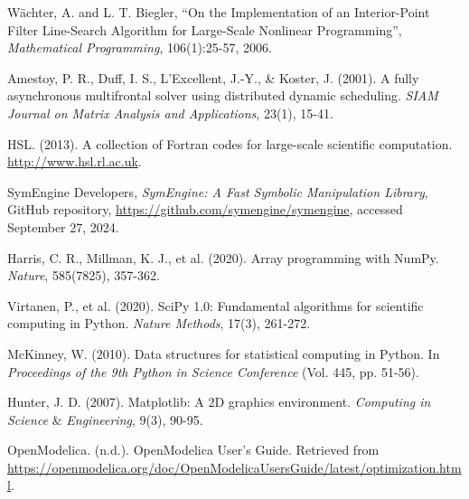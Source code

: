 \documentclass[12pt]{article}
\begin{document}
\newpage
\fancyhead[R]{}
\thispagestyle{fancy}

\begin{thebibliography}{9}
	
	
	
	Wächter, A. and L. T. Biegler, “On the Implementation of an Interior-Point Filter Line-Search Algorithm for Large-Scale Nonlinear Programming”, \textit{Mathematical Programming}, 106(1):25-57, 2006.
	
	Amestoy, P. R., Duff, I. S., L’Excellent, J.-Y., \& Koster, J. (2001). A fully asynchronous multifrontal solver using distributed dynamic scheduling. \textit{SIAM Journal on Matrix Analysis and Applications}, 23(1), 15-41.
	
	HSL. (2013). A collection of Fortran codes for large-scale scientific computation. \url{http://www.hsl.rl.ac.uk}.
	
	
	SymEngine Developers, 
	\textit{SymEngine: A Fast Symbolic Manipulation Library}, 
	GitHub repository, 
	\url{https://github.com/symengine/symengine}, 
	accessed September 27, 2024.
	
	Harris, C. R., Millman, K. J., et al. (2020). Array programming with NumPy. \textit{Nature}, 585(7825), 357-362.
	
	Virtanen, P., et al. (2020). SciPy 1.0: Fundamental algorithms for scientific computing in Python. \textit{Nature Methods}, 17(3), 261-272.
	
	McKinney, W. (2010). Data structures for statistical computing in Python. In \textit{Proceedings of the 9th Python in Science Conference} (Vol. 445, pp. 51-56).
	
	Hunter, J. D. (2007). Matplotlib: A 2D graphics environment. \textit{Computing in Science} \& \textit{Engineering}, 9(3), 90-95.
	
	OpenModelica. (n.d.). OpenModelica User's Guide. Retrieved from \url{https://openmodelica.org/doc/OpenModelicaUsersGuide/latest/optimization.html}.
	
\end{thebibliography}
\end{document}
